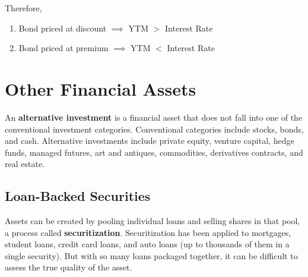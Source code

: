 \documentclass{article}
\begin{document}
    Therefore, 
    \begin{enumerate}
      \item Bond priced at discount $\implies$ YTM $>$ Interest Rate
      \item Bond priced at premium $\implies$ YTM $<$ Interest Rate
    \end{enumerate}

\section{Other Financial Assets}

  \begin{definition}
    An \textbf{alternative investment} is a financial asset that does not fall into one of the conventional investment categories. Conventional categories include stocks, bonds, and cash. Alternative investments include private equity, venture capital, hedge funds, managed futures, art and antiques, commodities, derivatives contracts, and real estate. 
  \end{definition}

  \subsection{Loan-Backed Securities}

    \begin{definition}[Securitization]
      Assets can be created by pooling individual loans and selling shares in that pool, a process called \textbf{securitization}. Securitization has been applied to mortgages, student loans, credit card loans, and auto loans (up to thousands of them in a single security). But with so many loans packaged together, it can be difficult to assess the true quality of the asset. 
    \end{definition}
\end{document}
